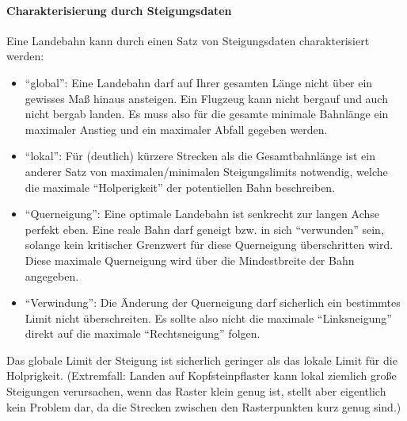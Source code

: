 \documentclass[
11pt, %
a4paper, %
oneside, %
pdfspacing, %
headinclude,
BCOR5mm, %
ngerman, %
bibtotocnumbered,
]{scrartcl}
\begin{document}
	\paragraph{Charakterisierung durch Steigungsdaten}
	Eine Landebahn kann durch einen Satz von Steigungsdaten charakterisiert werden:
	\begin{itemize}
		\item "`global"': Eine Landebahn darf auf Ihrer gesamten Länge nicht über ein gewisses Maß hinaus ansteigen. Ein Flugzeug kann nicht bergauf und auch nicht bergab landen. Es muss also für die gesamte minimale Bahnlänge ein maximaler Anstieg und ein maximaler Abfall gegeben werden.
		\item "`lokal"': Für (deutlich) kürzere Strecken als die Gesamtbahnlänge ist ein anderer Satz von maximalen/minimalen Steigungslimits notwendig, welche die maximale "`Holperigkeit"' der potentiellen Bahn beschreiben.
		\item "`Querneigung"': Eine optimale Landebahn ist senkrecht zur langen Achse perfekt eben. Eine reale Bahn darf geneigt bzw. in sich "`verwunden"' sein, solange kein kritischer Grenzwert für diese Querneigung überschritten wird. Diese maximale Querneigung wird über die Mindestbreite der Bahn angegeben.
		\item "`Verwindung"': Die Änderung der Querneigung darf sicherlich ein bestimmtes Limit nicht überschreiten. Es sollte also nicht die maximale "`Linksneigung"' direkt auf die maximale "`Rechtsneigung"' folgen.
	\end{itemize}

	Das globale Limit der Steigung ist sicherlich geringer als das lokale Limit für die Holprigkeit. (Extremfall: Landen auf Kopfsteinpflaster kann lokal ziemlich große Steigungen verursachen, wenn das Raster klein genug ist, stellt aber eigentlich kein Problem dar, da die Strecken zwischen den Rasterpunkten kurz genug sind.)
	
\end{document}
